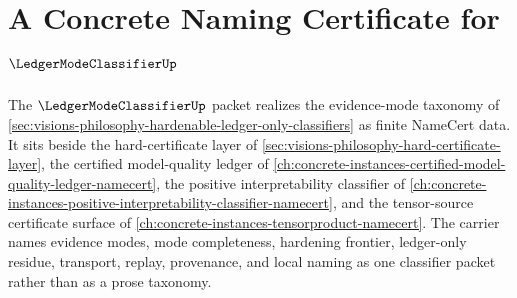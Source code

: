 \chapter{A Concrete Naming Certificate for $\LedgerModeClassifierUp$}
\label{ch:concrete-instances-ledger-mode-classifier-namecert}

The $\LedgerModeClassifierUp$ packet realizes the evidence-mode taxonomy of \autoref{sec:visions-philosophy-hardenable-ledger-only-classifiers} as finite NameCert data. It sits beside the hard-certificate layer of \autoref{sec:visions-philosophy-hard-certificate-layer}, the certified model-quality ledger of \autoref{ch:concrete-instances-certified-model-quality-ledger-namecert}, the positive interpretability classifier of \autoref{ch:concrete-instances-positive-interpretability-classifier-namecert}, and the tensor-source certificate surface of \autoref{ch:concrete-instances-tensorproduct-namecert}. The carrier names evidence modes, mode completeness, hardening frontier, ledger-only residue, transport, replay, provenance, and local naming as one classifier packet rather than as a prose taxonomy.

